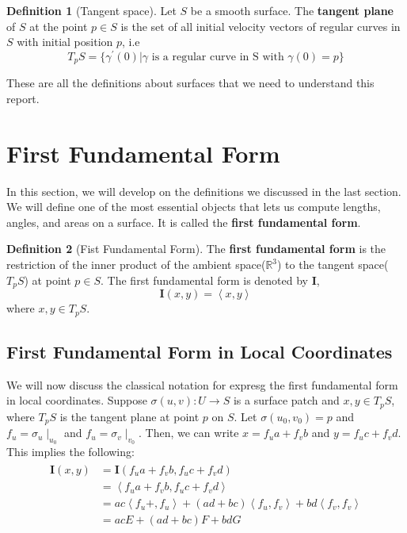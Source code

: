 \documentclass{article}
\theoremstyle{plain}
\theoremstyle{definition}
\newtheorem{definition}{Definition}
\theoremstyle{remark}
\newcommand{\R}{\mathbb{R}}
\begin{document}
\begin{definition}[Tangent space]
    Let \(S\) be a smooth surface. The \textbf{tangent plane} of \(S\) at the point \( p \in S\) is the set of all initial velocity vectors of regular curves in \(S\) with initial position \(p\), i.e \[ T_pS = \{ \gamma^\prime(0) | \gamma \text{ is a regular curve in S with }\gamma(0) = p\} \]
\end{definition}

These are all the definitions about surfaces that we need to understand this report.

\section{First Fundamental Form}
In this section, we will develop on the definitions we discussed in the last section. We will define one of the most essential objects that lets us compute lengths, angles, and areas on a surface. It is called the \textbf{first fundamental form}.

\begin{definition}[Fist Fundamental Form]
    The \textbf{first fundamental form} is the restriction of the inner product of the ambient space(\(\R^3\)) to the tangent space(\( T_pS\)) at point \( p \in S\). The first fundamental form is denoted by \( \mathbf{I} \), \[ \mathbf{I}(x,y) = \left\langle x,y\right\rangle  \] where \( x,y \in T_pS\).
\end{definition}

\subsection{First Fundamental Form in Local Coordinates} \label{ssec: The first fundamental form in local coordinates}
We will now discuss the classical notation for expresg the first fundamental form in local coordinates. Suppose \( \sigma(u,v): U \rightarrow S\) is a surface patch and \( x,y \in T_pS \), where \(T_pS\) is the tangent plane at point \(p\) on \(S\). Let \( \sigma(u_0, v_0) = p \) and \( f_u = \sigma_u \mid_{u_0} \) and \( f_u = \sigma_v \mid_{v_0} \). Then, we can write \(x =  f_u a + f_v b\) and \( y =  f_u c + f_v d\). This implies the following:
\begin{align}
    \begin{split}
        \mathbf{I}(x,y) & = \mathbf{I}( f_u a + f_v b,  f_u c + f_v d) \\
        & = \left\langle f_u a + f_v b,  f_u c + f_v d \right\rangle \\
        & = ac\left\langle  f_u  +,  f_u  \right\rangle + (ad+bc)\left\langle  f_u  , f_v  \right\rangle + bd \left\langle f_v , f_v  \right\rangle \\
        & = ac E + (ad+bc)F + bd G
    \end{split}
\end{align}
\end{document}
